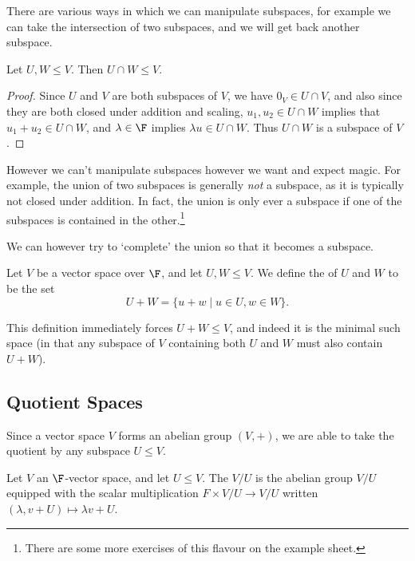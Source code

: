 \documentclass[a4paper]{scrartcl}
\begin{document}
There are various ways in which we can manipulate subspaces, for example we can take the intersection of two subspaces, and we will get back another subspace. 

\begin{proposition}
    Let $U, W \leq V$. Then $U \cap W \leq V$.
\end{proposition}
\begin{proof}
    Since $U$ and $V$ are both subspaces of $V$, we have $0_V \in U \cap V$, and also since they are both closed under addition and scaling, $u_1, u_2 \in U \cap W$ implies that $u_1 + u_2 \in U \cap W$, and $\lambda \in \F$ implies $\lambda u \in U\cap W$. Thus $U \cap W$ is a subspace of $V$. 
\end{proof}

However we can't manipulate subspaces however we want and expect magic. For example, the union of two subspaces is generally \emph{not} a subspace, as it is typically not closed under addition. In fact, the union is only ever a subspace if one of the subspaces is contained in the other.\footnote{There are some more exercises of this flavour on the example sheet.}

We can however try to `complete' the union so that it becomes a subspace.

\begin{definition}
    Let $V$ be a vector space over $\F$, and let $U, W \leq V$. We define the  of $U$ and $W$ to be the set
    $$
    U + W = \{u + w \mid u \in U, w \in W \}.
    $$
\end{definition}

This definition immediately forces $U + W \leq V$, and indeed it is the minimal such space (in that any subspace of $V$ containing both $U$ and $W$ must also contain $U + W$).

\subsection{Quotient Spaces}

Since a vector space $V$ forms an abelian group $(V, +)$, we are able to take the quotient by any subspace $U \leq V$. 

\begin{definition}
    Let $V$ an $\F$-vector space, and let $U \leq V$. The  $V/U$ is the abelian group $V/U$ equipped with the scalar multiplication $F \times V/U \rightarrow V/U$ written $(\lambda, v + U) \mapsto \lambda v + U$.
\end{definition}
\end{document}
